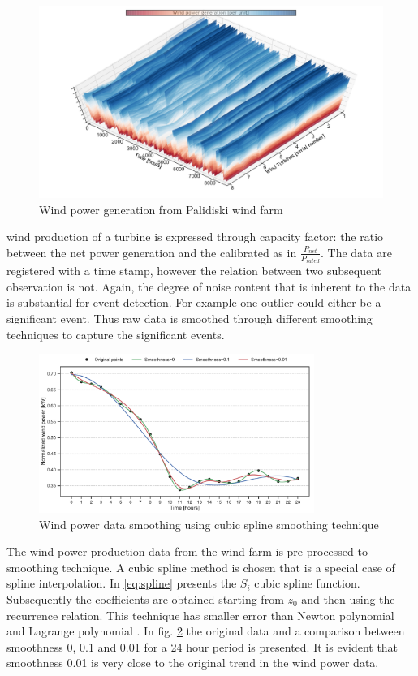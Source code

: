   \begin{figure}[!htbp]
    \centering
    \includegraphics[width=\textwidth]{./sec/fig/wind_data.pdf}
    \caption{Wind power generation from Palidiski wind farm}
    \label{fig:wind_data}
\end{figure}

wind production of a turbine is expressed through capacity factor: the ratio between the net power generation and the calibrated  as in \( \displaystyle \frac{P_{net}}{P_{rated}} \). The data are registered with a time stamp, however the relation between two subsequent observation is not. Again, the degree of noise content that is inherent to the data is substantial for event detection. For example one outlier could either be a significant event. Thus raw data is smoothed through different smoothing techniques to capture the significant events. 

\begin{figure}[!htbp]
 \centering
    \includegraphics[width=0.8\textwidth]{./sec/fig/Splined_Plot.pdf}
    \caption{Wind power data smoothing using cubic spline smoothing technique}
    \label{fig:data_splined}
\end{figure}

The wind power production data from the wind farm is pre-processed to smoothing technique. A cubic spline method is chosen that is a special case of spline interpolation. In \eqref{eq:spline} presents the $S_i$ cubic spline function. Subsequently the coefficients are obtained starting from $z_0$ and then using the recurrence relation. This technique has smaller error than Newton polynomial and Lagrange polynomial \cite{de1978practical}. In fig. \ref{fig:data_splined} the original data and a comparison between smoothness 0, 0.1 and 0.01 for a 24 hour period is presented. It is evident that smoothness 0.01 is very close to the original trend in the wind power data. 


